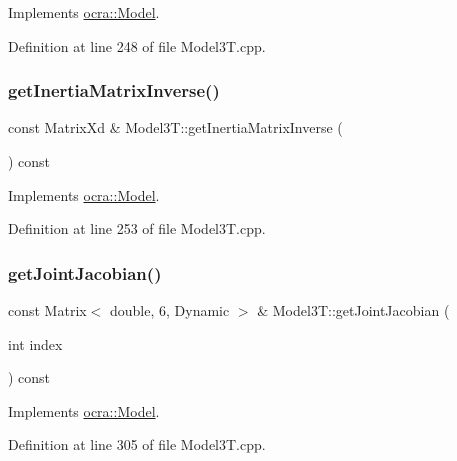 Implements \hyperlink{classocra_1_1Model_adf59aeee10c9d3babb05d7249bf71106}{ocra\+::\+Model}.



Definition at line 248 of file Model3\+T.\+cpp.

\hypertarget{classModel3T_a25860bdbf24d115cc7dafe75cc7a8197}{}\label{classModel3T_a25860bdbf24d115cc7dafe75cc7a8197} 
\subsubsection{\texorpdfstring{get\+Inertia\+Matrix\+Inverse()}{getInertiaMatrixInverse()}}
{\footnotesize\ttfamily const Matrix\+Xd \& Model3\+T\+::get\+Inertia\+Matrix\+Inverse (\begin{DoxyParamCaption}{ }\end{DoxyParamCaption}) const\hspace{0.3cm}{\ttfamily [virtual]}}



Implements \hyperlink{classocra_1_1Model_ac1b1137365a6f6765d41d68bc02f3e62}{ocra\+::\+Model}.



Definition at line 253 of file Model3\+T.\+cpp.

\hypertarget{classModel3T_a6fd62404b6e74f239142c6a4de76d7e9}{}\label{classModel3T_a6fd62404b6e74f239142c6a4de76d7e9} 
\subsubsection{\texorpdfstring{get\+Joint\+Jacobian()}{getJointJacobian()}}
{\footnotesize\ttfamily const Matrix$<$ double, 6, Dynamic $>$ \& Model3\+T\+::get\+Joint\+Jacobian (\begin{DoxyParamCaption}\item[{int}]{index }\end{DoxyParamCaption}) const\hspace{0.3cm}{\ttfamily [virtual]}}



Implements \hyperlink{classocra_1_1Model_ad0001f469b4aa484403e781f6bd933aa}{ocra\+::\+Model}.



Definition at line 305 of file Model3\+T.\+cpp.

